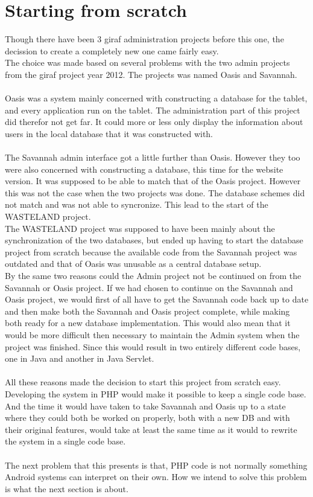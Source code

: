 \section{Starting from scratch}
Though there have been 3 \ac{giraf} administration projects before this one, the decission to create a completely new one came fairly easy.\\
The choice was made based on several problems with the two admin projects from the \ac{giraf} project year 2012. The projects was named Oasis and Savannah.\\
\\
Oasis was a system mainly concerned with constructing a database for the tablet, and every application run on the tablet. The administration part of this project did therefor not get far. It could more or less only display the information about users in the local database that it was constructed with.\\
\\
The Savannah admin interface got a little further than Oasis. However they too were also concerned with constructing a database, this time for the website version. It was supposed to be able to match that of the Oasis project. However this was not the case when the two projects was done. The database schemes did not match and was not able to syncronize. This lead to the start of the WASTELAND project.\\
The WASTELAND project was supposed to have been mainly about the synchronization of the two databases, but ended up having to start the database project from scratch because the available code from the Savannah project was outdated and that of Oasis was unusable as a central database setup.\\
By the same two reasons could the Admin project not be continued on from the Savannah or Oasis project. If we had chosen to continue on the Savannah and Oasis project, we would first of all have to get the Savannah code back up to date and then make both the Savannah and Oasis project complete, while making both ready for a new database implementation. This would also mean that it would be more difficult then necessary to maintain the Admin system when the project was finished. Since this would result in two entirely different code bases, one in Java and another in Java Servlet.\\
\\
All these reasons made the decision to start this project from scratch easy. Developing the system in PHP would make it possible to keep a single code base. And the time it would have taken to take Savannah and Oasis up to a state where they could both be worked on properly, both with a new DB and with their original features, would take at least the same time as it would to rewrite the system in a single code base.\\
\\
The next problem that this presents is that, PHP code is not normally something Android systems can interpret on their own. How we intend to solve this problem is what the next section is about.

